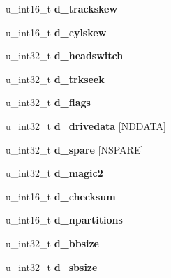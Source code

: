 \begin{DoxyCompactItemize}
u\+\_\+int16\+\_\+t {\bfseries d\+\_\+trackskew}
\item 
\mbox{\label{structdisklabel_aa4cbf48789ecea709aa6244acb8f380f}} 
u\+\_\+int16\+\_\+t {\bfseries d\+\_\+cylskew}
\item 
\mbox{\label{structdisklabel_a39c121b0c82f20342477a0c455155fda}} 
u\+\_\+int32\+\_\+t {\bfseries d\+\_\+headswitch}
\item 
\mbox{\label{structdisklabel_ad8ab3cd6cb8cda48c419becd9f13493b}} 
u\+\_\+int32\+\_\+t {\bfseries d\+\_\+trkseek}
\item 
\mbox{\label{structdisklabel_aea92be66ec1a77c462b2d26a4512c308}} 
u\+\_\+int32\+\_\+t {\bfseries d\+\_\+flags}
\item 
\mbox{\label{structdisklabel_ae7fdadb0a7c1cab3572ffee52b2f7dcd}} 
u\+\_\+int32\+\_\+t {\bfseries d\+\_\+drivedata} \mbox{[}N\+D\+D\+A\+TA\mbox{]}
\item 
\mbox{\label{structdisklabel_adc1ca1fb6cfb23a2e0799ce428dad1de}} 
u\+\_\+int32\+\_\+t {\bfseries d\+\_\+spare} \mbox{[}N\+S\+P\+A\+RE\mbox{]}
\item 
\mbox{\label{structdisklabel_a41c402e54423bcb9bd341371400ce290}} 
u\+\_\+int32\+\_\+t {\bfseries d\+\_\+magic2}
\item 
\mbox{\label{structdisklabel_adba9a7871f8d51fe8de5bf1d2c5d9481}} 
u\+\_\+int16\+\_\+t {\bfseries d\+\_\+checksum}
\item 
\mbox{\label{structdisklabel_aea37a6c3755034ad9b0f381319517e90}} 
u\+\_\+int16\+\_\+t {\bfseries d\+\_\+npartitions}
\item 
\mbox{\label{structdisklabel_a39948880763e7be5f457f2a4ad95641b}} 
u\+\_\+int32\+\_\+t {\bfseries d\+\_\+bbsize}
\item 
\mbox{\label{structdisklabel_a73d78381c6cb5c96e68c80f6e91fa501}} 
u\+\_\+int32\+\_\+t {\bfseries d\+\_\+sbsize}
\item 

\end{DoxyCompactItemize}
